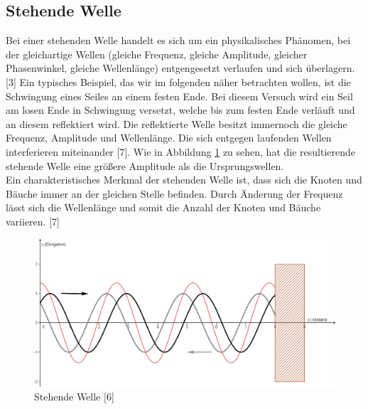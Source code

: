 \documentclass[a4paper]{scrartcl}
\numberwithin{equation}{subsection}
\begin{document}
\subsection{Stehende Welle}
Bei einer stehenden Welle handelt es sich um ein physikalisches Phänomen, bei der gleichartige Wellen (gleiche Frequenz, gleiche Amplitude, gleicher Phasenwinkel, gleiche Wellenlänge) entgengesetzt verlaufen und sich überlagern. [3] Ein typisches Beispiel, das wir im folgenden näher betrachten wollen, ist die Schwingung eines Seiles an einem festen Ende.
Bei diesem Versuch wird ein Seil am losen Ende in Schwingung versetzt, welche bis zum festen Ende verläuft und an diesem reflektiert wird. Die reflektierte Welle besitzt immernoch die gleiche Frequenz, Amplitude und Wellenlänge. Die sich entgegen laufenden Wellen interferieren miteinander [7]. Wie in Abbildung \ref{fig:steh-welle-print} zu sehen, hat die resultierende stehende Welle eine größere Amplitude als die Ursprungswellen.\\
Ein charakteristisches Merkmal der stehenden Welle ist, dass sich die Knoten und Bäuche immer an der gleichen Stelle befinden. Durch Änderung der Frequenz lässt sich die Wellenlänge und somit die Anzahl der Knoten und Bäuche variieren. [7]
\begin{figure}[H]
\includegraphics[width=12cm]{steh-welle-print}
\centering
\caption{Stehende Welle [6]}
\centering
\label{fig:steh-welle-print}

\end{figure}
\end{document}
